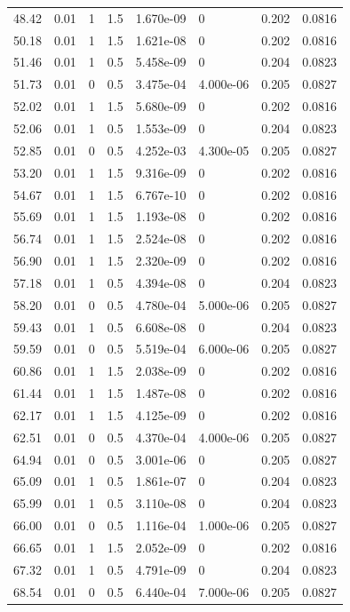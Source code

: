 \documentclass[preview]{standalone}
\begin{document}
{{{\begin{tabular}{L{1.2cm}C{1.2cm} C{0.3cm}C{0.5cm} C{1.4cm}C{1.4cm} C{1.4cm}C{1.4cm}}
  48.42  &  0.01  & 1     & 1.5 &  1.670e-09  & 0  & 0.202 &  0.0816   \\ 
  50.18  &  0.01  & 1     & 1.5 &  1.621e-08  & 0  & 0.202 &  0.0816   \\ 
  51.46  &  0.01  & 1     & 0.5 &  5.458e-09  & 0  & 0.204 &  0.0823   \\ 
  51.73  &  0.01  & 0     & 0.5 &  3.475e-04  & 4.000e-06  & 0.205 &  0.0827   \\ 
  52.02  &  0.01  & 1     & 1.5 &  5.680e-09  & 0  & 0.202 &  0.0816   \\ 
  52.06  &  0.01  & 1     & 0.5 &  1.553e-09  & 0  & 0.204 &  0.0823   \\ 
  52.85  &  0.01  & 0     & 0.5 &  4.252e-03  & 4.300e-05  & 0.205 &  0.0827   \\ 
  53.20  &  0.01  & 1     & 1.5 &  9.316e-09  & 0  & 0.202 &  0.0816   \\ 
  54.67  &  0.01  & 1     & 1.5 &  6.767e-10  & 0  & 0.202 &  0.0816   \\ 
  55.69  &  0.01  & 1     & 1.5 &  1.193e-08  & 0  & 0.202 &  0.0816   \\ 
  56.74  &  0.01  & 1     & 1.5 &  2.524e-08  & 0  & 0.202 &  0.0816   \\ 
  56.90  &  0.01  & 1     & 1.5 &  2.320e-09  & 0  & 0.202 &  0.0816   \\ 
  57.18  &  0.01  & 1     & 0.5 &  4.394e-08  & 0  & 0.204 &  0.0823   \\ 
  58.20  &  0.01  & 0     & 0.5 &  4.780e-04  & 5.000e-06  & 0.205 &  0.0827   \\ 
  59.43  &  0.01  & 1     & 0.5 &  6.608e-08  & 0  & 0.204 &  0.0823   \\ 
  59.59  &  0.01  & 0     & 0.5 &  5.519e-04  & 6.000e-06  & 0.205 &  0.0827   \\ 
  60.86  &  0.01  & 1     & 1.5 &  2.038e-09  & 0  & 0.202 &  0.0816   \\ 
  61.44  &  0.01  & 1     & 1.5 &  1.487e-08  & 0  & 0.202 &  0.0816   \\ 
  62.17  &  0.01  & 1     & 1.5 &  4.125e-09  & 0  & 0.202 &  0.0816   \\ 
  62.51  &  0.01  & 0     & 0.5 &  4.370e-04  & 4.000e-06  & 0.205 &  0.0827   \\ 
  64.94  &  0.01  & 0     & 0.5 &  3.001e-06  & 0  & 0.205 &  0.0827   \\ 
  65.09  &  0.01  & 1     & 0.5 &  1.861e-07  & 0  & 0.204 &  0.0823   \\ 
  65.99  &  0.01  & 1     & 0.5 &  3.110e-08  & 0  & 0.204 &  0.0823   \\ 
  66.00  &  0.01  & 0     & 0.5 &  1.116e-04  & 1.000e-06  & 0.205 &  0.0827   \\ 
  66.65  &  0.01  & 1     & 1.5 &  2.052e-09  & 0  & 0.202 &  0.0816   \\ 
  67.32  &  0.01  & 1     & 0.5 &  4.791e-09  & 0  & 0.204 &  0.0823   \\ 
  68.54  &  0.01  & 0     & 0.5 &  6.440e-04  & 7.000e-06  & 0.205 &  0.0827   \\ 
\hline 
\end{tabular} 

}}}
\end{document}
